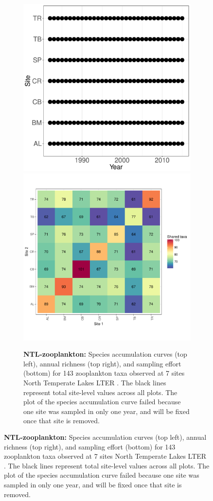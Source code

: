 \documentclass[11pt, oneside]{article}
\begin{document}
\begin{figure}[h!]
\begin{figure}[h!]
\includegraphics[scale = 0.4]{ntl-zooplankton-stanleyLottig_spatiotemporal_sampling_effort.pdf}
\includegraphics[scale = 0.4]{ntl-zooplankton-stanleyLottig_spp_shared.pdf}
\caption{{\bf NTL-zooplankton:} Species accumulation curves (top left),  annual richness (top right), and sampling effort (bottom)  for 143 zooplankton taxa observed at 7 sites North Temperate Lakes LTER . The black lines represent total site-level values across all plots. The plot of the species accumulation curve failed because one site was sampled in only one year, and will be fixed once that site is removed.}
\label{ntl-zooplankton}
\end{figure}



\end{figure}
\end{document}
